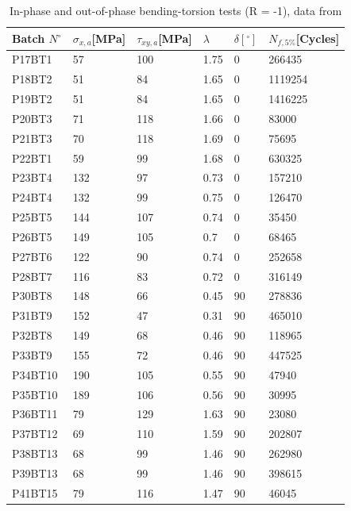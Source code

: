 \begin{table}[!h]
\centering
\begin{tabular}{|l|l|l|l|l|l|}
\hline
Batch $N^\circ$ & $\sigma_{x,a}${[}MPa{]} & $\tau_{xy,a}${[}MPa{]} & $\lambda$ & $\delta [^\circ]$ & $N_{f,5\%}${[}Cycles{]} \\ \hline
P17BT1 & 57 & 100 & 1.75 & 0 & 266435 \\ \hline
P18BT2 & 51 & 84 & 1.65 & 0 & 1119254 \\ \hline
P19BT2 & 51 & 84 & 1.65 & 0 & 1416225 \\ \hline
P20BT3 & 71 & 118 & 1.66 & 0 & 83000 \\ \hline
P21BT3 & 70 & 118 & 1.69 & 0 & 75695 \\ \hline
P22BT1 & 59 & 99 & 1.68 & 0 & 630325 \\ \hline
P23BT4 & 132 & 97 & 0.73 & 0 & 157210 \\ \hline
P24BT4 & 132 & 99 & 0.75 & 0 & 126470 \\ \hline
P25BT5 & 144 & 107 & 0.74 & 0 & 35450 \\ \hline
P26BT5 & 149 & 105 & 0.7 & 0 & 68465 \\ \hline
P27BT6 & 122 & 90 & 0.74 & 0 & 252658 \\ \hline
P28BT7 & 116 & 83 & 0.72 & 0 & 316149 \\ \hline
P30BT8 & 148 & 66 & 0.45 & 90 & 278836 \\ \hline
P31BT9 & 152 & 47 & 0.31 & 90 & 465010 \\ \hline
P32BT8 & 149 & 68 & 0.46 & 90 & 118965 \\ \hline
P33BT9 & 155 & 72 & 0.46 & 90 & 447525 \\ \hline
P34BT10 & 190 & 105 & 0.55 & 90 & 47940 \\ \hline
P35BT10 & 189 & 106 & 0.56 & 90 & 30995 \\ \hline
P36BT11 & 79 & 129 & 1.63 & 90 & 23080 \\ \hline
P37BT12 & 69 & 110 & 1.59 & 90 & 202807 \\ \hline
P38BT13 & 68 & 99 & 1.46 & 90 & 262980 \\ \hline
P39BT13 & 68 & 99 & 1.46 & 90 & 398615 \\ \hline
P41BT15 & 79 & 116 & 1.47 & 90 & 46045 \\ \hline
\end{tabular}
\caption{In-phase and out-of-phase bending-torsion tests (R = -1), data from \cite{susmel2003multiaxial}}
\label{tab.AL6082T6BT2D}
\end{table}


